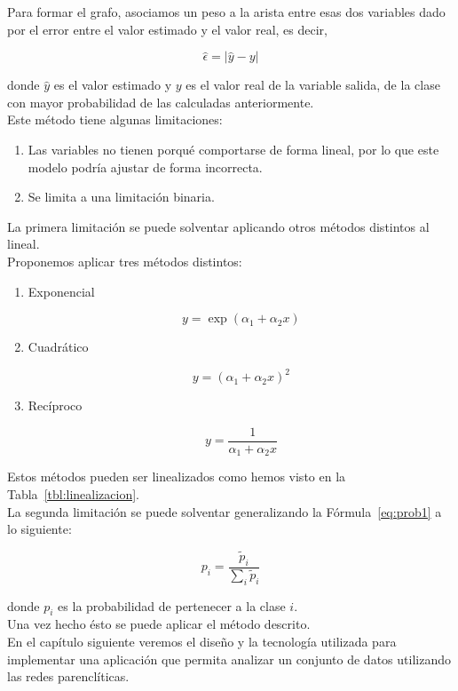 Para formar el grafo, asociamos un peso a la arista entre esas dos variables dado por el error entre el valor estimado y el valor real, es decir,

\begin{equation}
\hat{\epsilon} = |\hat{y} - y|
\end{equation} 

donde $\hat{y}$ es el valor estimado y $y$ es el valor real de la variable salida, de la clase con mayor probabilidad de las calculadas anteriormente.\\

Este método tiene algunas limitaciones:

\begin{enumerate}
	\item Las variables no tienen porqué comportarse de forma lineal, por lo que este modelo podría ajustar de forma incorrecta.
	\item Se limita a una limitación binaria. 
\end{enumerate}

La primera limitación se puede solventar aplicando otros métodos distintos al lineal.\\

Proponemos aplicar tres métodos distintos:

\begin{enumerate}
	\item Exponencial
	
	\begin{equation}
	y = \exp(\alpha_1 + \alpha_2 x)
	\end{equation}
	
	\item Cuadrático
	
	\begin{equation}
	y = (\alpha_1 + \alpha_2 x)^2
	\end{equation}
	
	\item Recíproco
	
	\begin{equation}
	y = \dfrac{1}{\alpha_1 + \alpha_2 x}
	\end{equation}
\end{enumerate}

Estos métodos pueden ser linealizados como hemos visto en la Tabla~\ref{tbl:linealizacion}.\\

La segunda limitación se puede solventar generalizando la Fórmula~\ref{eq:prob1} a lo siguiente:

\begin{equation}
p_i = \dfrac{\tilde{p}_i}{\sum_{i} \tilde{p}_i }
\end{equation}

donde ${p}_i$ es la probabilidad de pertenecer a la clase $i$.\\

Una vez hecho ésto se puede aplicar el método descrito.\\

En el capítulo siguiente veremos el diseño y la tecnología utilizada para implementar una aplicación que permita analizar un conjunto de datos utilizando las redes parenclíticas.